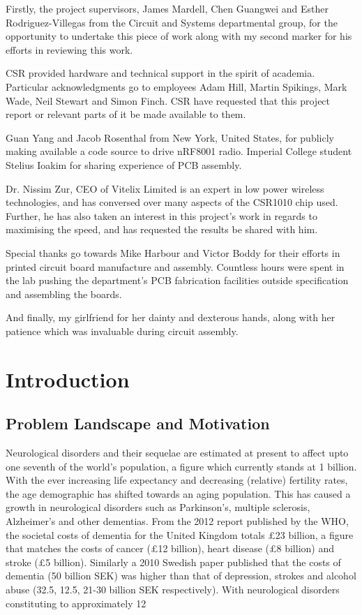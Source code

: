 \documentclass[]{article}
\begin{document}
Firstly, the project supervisors, James Mardell, Chen Guangwei and Esther Rodriguez-Villegas from the Circuit and Systems departmental group, for the opportunity to undertake this piece of work along with my second marker for his efforts in reviewing this work. 

\ac{CSR} provided hardware and technical support in the spirit of academia. Particular acknowledgments go to employees Adam Hill, Martin Spikings, Mark Wade, Neil Stewart and Simon Finch. CSR have requested that this project report or relevant parts of it be made available to them.

Guan Yang and Jacob Rosenthal from New York, United States, for publicly making available a code source to drive nRF8001 radio. Imperial College student Stelius Ioakim for sharing experience of \ac{PCB} assembly. 

Dr. Nissim Zur, CEO of Vitelix Limited is an expert in low power wireless technologies, and has conversed over many aspects of the CSR1010 chip used. Further, he has also taken an interest in this project's work in regards to maximising the speed, and has requested the results be shared with him.

Special thanks go towards Mike Harbour and Victor Boddy for their efforts in printed circuit board manufacture and assembly. Countless hours were spent in the lab pushing the department's PCB fabrication facilities outside specification and assembling the boards. 

And finally, my girlfriend for her dainty and dexterous hands, along with her patience which was invaluable during circuit assembly. 

\clearpage

\section{Introduction}

\subsection{Problem Landscape and Motivation}
Neurological disorders and their sequelae are estimated at present to affect upto one seventh of the world's population, a figure which currently stands at 1 billion. With the ever increasing life expectancy and decreasing (relative) fertility rates, the age demographic has shifted towards an aging population. This has caused a growth in neurological disorders such as Parkinson's, multiple sclerosis, Alzheimer's and other dementias. From the 2012 report published by the \ac{WHO}\cite{WorldHealthOrganization2012}, the societal costs of dementia for the United Kingdom totals £23 billion, a figure that matches the costs of cancer (£12 billion), heart disease (£8 billion) and stroke (£5 billion). Similarly a 2010 Swedish paper published that the costs of dementia (50 billion SEK) was higher than that of depression, strokes and alcohol abuse (32.5, 12.5, 21-30 billion SEK respectively)\cite{Wimo2010}. With neurological disorders constituting to approximately 12%
\end{document}
